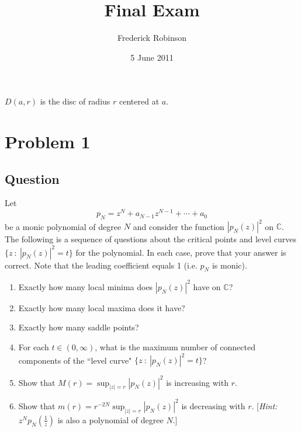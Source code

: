 \documentclass[11pt]{article}
\begin{document}



\title{Final Exam}
\author{Frederick Robinson}
\date{5 June 2011}
\maketitle

$D(a,r)$ is the disc of radius $r$ centered at $a$.

\section{Problem 1}\label{problem1}
\subsection{Question}
Let 
\[p_N = z^N + a_{N-1} z^{N-1} + \cdots  + a_0\]
be a monic polynomial of degree $N$ and consider the function $|p_N(z)|^2$ on $\mathbb{C}$. The following is a sequence of questions about the critical points and level curves $\{ z \ :\  |p_N (z)|^2 = t\}$ for the polynomial. In each case, prove that your answer is correct. Note that the leading coefficient equals 1 (i.e. $p_N$ is monic).
\begin{enumerate}  
\item Exactly how many local minima does $|p_N(z)|^2$ have on $\mathbb{C}$?
\item Exactly how many local maxima does it have?
\item Exactly how many saddle points?
\item For each $t \in (0 , \infty)$, what is the maximum number of connected components of the ``level curve" $\{z \ : \ |p_N(z)|^2=t\}$?
\item \label{lastprob} Show that $M(r) = \sup_{|z| =r} |p_N(z)|^2$ is increasing with $r$.
\item Show that $m(r) = r^{-2N} \sup_{|z|=r} |p_N(z)|^2$ is decreasing with $r$. [\emph{Hint:} $z^N p_N( \frac{1}{z})$ is also a polynomial of degree $N$.]
\end{enumerate} 
\end{document}
